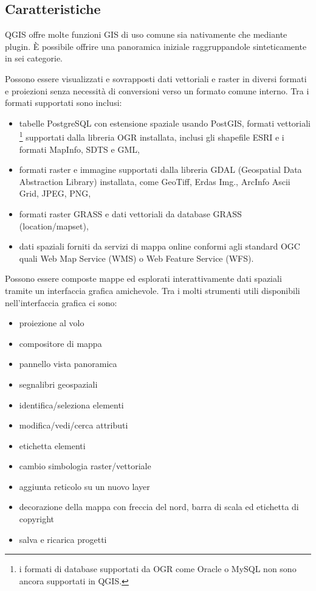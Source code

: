 \subsection{Caratteristiche}\label{label_majfeat}

QGIS offre molte funzioni GIS di uso comune sia nativamente che mediante plugin. È possibile offrire
una panoramica iniziale raggruppandole sinteticamente
in sei categorie.


Possono essere visualizzati e sovrapposti dati vettoriali e raster
in diversi formati e proiezioni senza necessità di conversioni verso un formato
comune interno. Tra i formati supportati sono inclusi:

\begin{itemize}
\item tabelle PostgreSQL con estensione spaziale usando PostGIS, formati vettoriali
\footnote{i formati di database supportati da OGR come Oracle o MySQL non sono 
ancora supportati in QGIS.} supportati dalla libreria OGR installata, inclusi gli
shapefile ESRI e i formati MapInfo, SDTS e GML,
\item formati raster e immagine supportati dalla libreria GDAL (Geospatial
Data Abstraction Library) installata, come GeoTiff, Erdas Img., ArcInfo
Ascii Grid, JPEG, PNG,
\item formati raster GRASS e dati vettoriali da database GRASS (location/mapset), 
\item dati spaziali forniti da servizi di mappa online conformi agli standard
OGC quali Web Map Service (WMS) o Web Feature Service (WFS).
\end{itemize}


Possono essere composte mappe ed esplorati interattivamente dati spaziali
tramite un interfaccia grafica amichevole. Tra i molti strumenti utili disponibili
nell'interfaccia grafica ci sono:
\begin{itemize}
\item proiezione al volo
\item compositore di mappa
\item pannello vista panoramica 
\item segnalibri geospaziali 
\item identifica/seleziona elementi
\item modifica/vedi/cerca attributi
\item etichetta elementi
\item cambio simbologia raster/vettoriale
\item aggiunta reticolo su un nuovo layer 
\item decorazione della mappa con freccia del nord, barra di scala ed etichetta di copyright
\item salva e ricarica progetti
\end{itemize}

